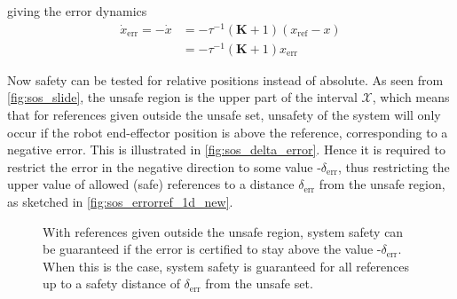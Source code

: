 \vspace{-5mm}
giving the error dynamics
\vspace{-3mm}
\begin{align}
\dot{x}_\text{err} = -\dot{x} &= -\tau^{-1}(\mathbf{K}+1)(x_\text{ref}-x) \nonumber\\
&= -\tau^{-1}(\mathbf{K}+1)x_\text{err}
\end{align}

\vspace{-2mm}
Now safety can  be tested for relative positions instead of absolute. 
As seen from \autoref{fig:sos_slide}, the unsafe region is the upper part of the interval $\mathcal{X}$, which means that for references given outside the unsafe set, unsafety of the system will only occur if the robot end-effector position is above the reference, corresponding to a negative error. This is illustrated in \autoref{fig:sos_delta_error}.
Hence it is required to restrict the error in the negative direction to some value -$\delta_\text{err}$, thus restricting the upper value of allowed (safe) references to a distance $\delta_\text{err}$ from the unsafe region, as sketched in \autoref{fig:sos_errorref_1d_new}. %




\begin{figure}[H]
\centering
{}%
\hspace{3mm}
%
\hspace{3mm}
%
\caption{With references given outside the unsafe region, system safety can be guaranteed if the error is certified to stay above the value -$\delta_\text{err}$. When this is the case, system safety is guaranteed for all references up to a safety distance of $\delta_\text{err}$ from the unsafe set.}
	\label{fig:sets_error}
\end{figure}

